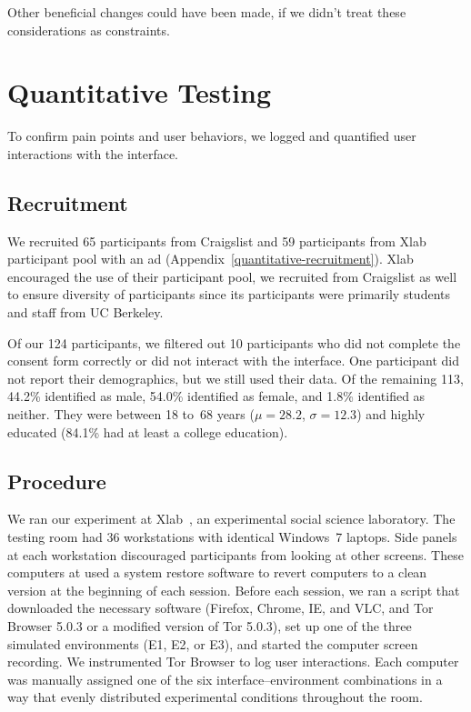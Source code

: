 \documentclass[USenglish,oneside,twocolumn]{article}
\begin{document}
Other beneficial changes could have been made, if we didn't treat these considerations as constraints.

\section{Quantitative Testing}
\label{sec:quantitative}
To confirm pain points and user behaviors, we logged and quantified user interactions with the interface.

\subsection{Recruitment}
We recruited 65 participants from Craigslist and 59 participants from Xlab participant pool with an ad (Appendix~\ref{quantitative-recruitment}). Xlab encouraged the use of their participant pool, we recruited from Craigslist as well to ensure diversity of participants since its participants were primarily students and staff from UC Berkeley.

Of our 124 participants, we filtered out 10 participants who did not complete the consent form correctly or did not interact with the interface. One participant did not report their demographics, but we still used their data. Of the remaining 113, 44.2\% identified as male, 54.0\% identified as female, and 1.8\% identified as neither. They were between 18 to~68 years ($\mu = 28.2$, $\sigma = 12.3$) and highly educated (84.1\% had at least a college education). 

\subsection{Procedure}
We ran our experiment at Xlab~\cite{xlab}, an experimental social science laboratory. The testing room had 36 workstations with identical Windows~7 laptops. Side panels at each workstation discouraged participants from looking at other screens. These computers at used a system restore software to revert computers to a clean version at the beginning of each session.  Before each session, we ran a script that downloaded the necessary software (Firefox, Chrome, IE, and VLC, and Tor Browser 5.0.3 or a modified version of Tor 5.0.3), set up one of the three simulated environments (E1, E2, or E3), and started the computer screen recording. We instrumented Tor Browser to log user interactions. Each computer was manually assigned one of the six interface--environment combinations in a way that evenly distributed experimental conditions throughout the room.
\end{document}
